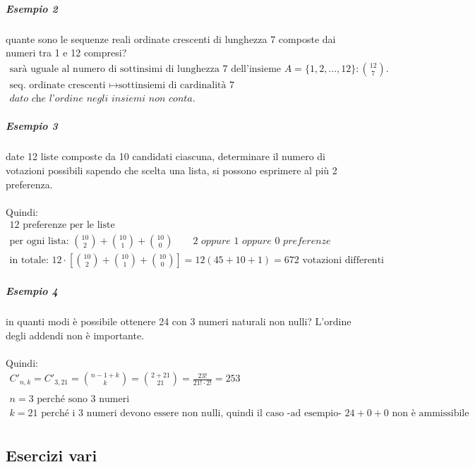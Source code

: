 \documentclass[italian]{article}
\newcommand{\combr}[2]{\text{$C'_{#1,#2}$}}
\begin{document}
\subparagraph{Esempio 2} quante sono le sequenze reali ordinate crescenti di lunghezza 7 composte dai numeri tra 1 e 12 compresi?
	\begin{gather*}
		\text{sarà uguale al  numero di sottinsimi di lunghezza 7 dell'insieme } A = \{ 1,2,...,12 \}: \binom{12}{7}. \\
		\text{seq. ordinate crescenti } \longmapsto \text{sottinsiemi di cardinalità 7}\\
		\textit{dato che l'ordine negli insiemi non conta.}
	\end{gather*}
	
\newpage
\subparagraph{Esempio 3} date 12 liste composte da 10 candidati ciascuna, determinare il numero di votazioni possibili sapendo che scelta una lista, si possono esprimere al più 2 preferenza. \\\\
Quindi:
\begin{gather*}
	\text{12 preferenze per le liste} \\
	\text{per ogni lista: } \binom{10}{2} + \binom{10}{1} + \binom{10}{0} \qquad \textit{2 oppure 1 oppure 0 preferenze} \\
	\text{in totale: } 12 \cdot \left[\binom{10}{2} + \binom{10}{1} + \binom{10}{0} \right] = 12(45 + 10 + 1) = 672 \text{ votazioni differenti}
\end{gather*}

\subparagraph{Esempio 4} in quanti modi è possibile ottenere 24 con 3 numeri naturali non nulli? L'ordine degli addendi non è importante. \\\\
Quindi:
\begin{gather*}
	\combr{n}{k} = \combr{3}{21} = \binom{n-1 + k}{k} = \binom{2 + 21}{21} = \frac{23!}{21!\cdot 2!} = 253 \\\\
	n = 3 \text{ perché sono 3 numeri} \\
	k = 21 \text{ perché i 3 numeri devono essere non nulli, quindi il caso -ad esempio-  $24 + 0 +0$ non è ammissibile} \\
\end{gather*}

\subsection{Esercizi vari}
\end{document}
